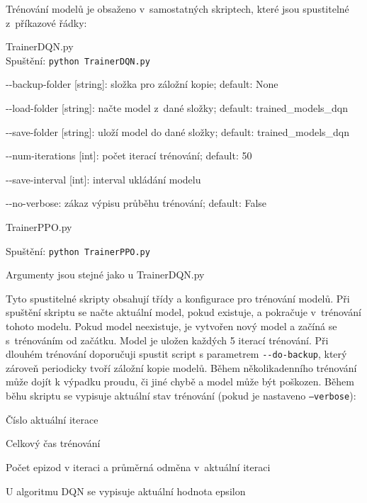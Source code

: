 Trénování modelů je obsaženo v~samostatných skriptech, které jsou spustitelné z~příkazové řádky:
\begin{myitemize}
  \item TrainerDQN.py\\
  Spuštění: \texttt{python TrainerDQN.py}
  \begin{myitemize}[${}$]
    \item -{}-backup-folder [string]: složka pro záložní kopie; default: None
    \item -{}-load-folder [string]: načte model z~dané složky; default: trained\_models\_dqn
    \item -{}-save-folder [string]: uloží model do dané složky; default: trained\_models\_dqn
    \item -{}-num-iterations [int]: počet iterací trénování; default: 50
    \item -{}-save-interval [int]: interval ukládání modelu
    \item -{}-no-verbose: zákaz výpisu průběhu trénování; default: False
  \end{myitemize}
  \item TrainerPPO.py
  \item Spuštění: \texttt{python TrainerPPO.py}
  \begin{myitemize}
  \item Argumenty jsou stejné jako u TrainerDQN.py
  \end{myitemize}
\end{myitemize}

Tyto spustitelné skripty obsahují třídy a konfigurace pro trénování modelů.
Při spuštění skriptu se načte aktuální model, pokud existuje, a pokračuje v~trénování tohoto modelu.
Pokud model neexistuje, je vytvořen nový model a začíná se s~trénováním od začátku.
Model je uložen každých 5 iterací trénování.
Při dlouhém trénování doporučuji spustit script s parametrem \texttt{-{}-do-backup}, který zároveň periodicky tvoří záložní kopie modelů.
Během několikadenního trénování může dojít k výpadku proudu, či jiné chybě a model může být poškozen.
Během běhu skriptu se vypisuje aktuální stav trénování (pokud je nastaveno \texttt{--verbose}):
\begin{myitemize}
  \item Číslo aktuální iterace
  \item Celkový čas trénování
  \item Počet epizod v iteraci a průměrná odměna v~aktuální iteraci
  \item U algoritmu DQN se vypisuje aktuální hodnota epsilon
\end{myitemize}


